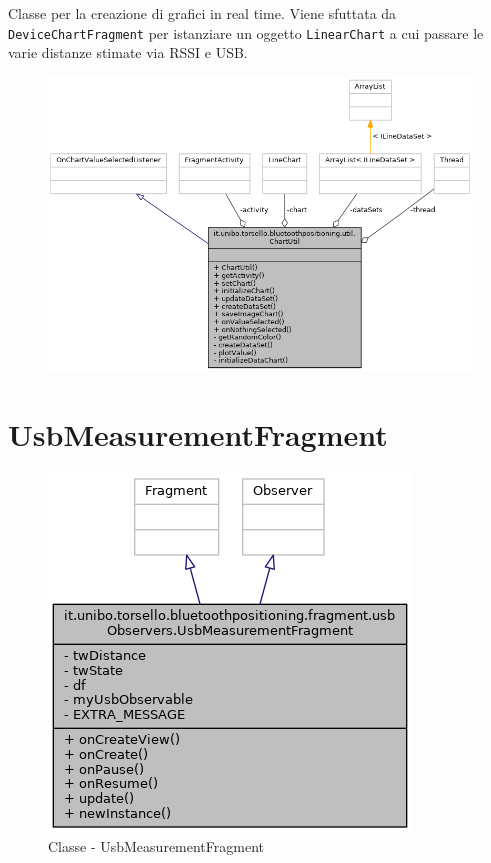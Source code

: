 Classe per la creazione di grafici in real time. Viene sfuttata da \texttt{DeviceChartFragment} per istanziare un oggetto \texttt{LinearChart} a cui passare le varie distanze stimate via RSSI e USB.
\begin{figure}[ph]
	\centering
	\includegraphics[width=1.2\linewidth]{img/uml/class/classit_1_1unibo_1_1torsello_1_1bluetoothpositioning_1_1util_1_1ChartUtil__coll__graph.png}
	\caption{}
\end{figure}

\newpage
\section{UsbMeasurementFragment}
\begin{figure}[ph]
	\centering
	\includegraphics[width=0.5\linewidth]{img/uml/class/classit_1_1unibo_1_1torsello_1_1bluetoothpositioning_1_1fragment_1_1usbObservers_1_1UsbMeasurementFragment__inherit__graph.png}
	\caption{Classe - UsbMeasurementFragment}
\end{figure}

